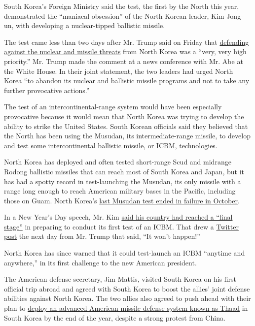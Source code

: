 South Korea's Foreign Ministry said the test, the first by the North
this year, demonstrated the ``maniacal obsession'' of the North Korean
leader, Kim Jong-un, with developing a nuclear-tipped ballistic missile.

The test came less than two days after Mr. Trump said on Friday that
\href{https://www.nytimes.com/reuters/2017/02/10/world/asia/10reuters-usa-trump-japan.html}{defending
against the nuclear and missile threats} from North Korea was a ``very,
very high priority.'' Mr. Trump made the comment at a news conference
with Mr. Abe at the White House. In their joint statement, the two
leaders had urged North Korea ``to abandon its nuclear and ballistic
missile programs and not to take any further provocative actions.''

The test of an intercontinental-range system would have been especially
provocative because it would mean that North Korea was trying to develop
the ability to strike the United States. South Korean officials said
they believed that the North has been using the Musudan, its
intermediate-range missile, to develop and test some intercontinental
ballistic missile, or ICBM, technologies.

North Korea has deployed and often tested short-range Scud and midrange
Rodong ballistic missiles that can reach most of South Korea and Japan,
but it has had a spotty record in test-launching the Musudan, its only
missile with a range long enough to reach American military bases in the
Pacific, including those on Guam. North Korea's
\href{https://www.nytimes.com/2016/10/20/world/asia/north-korea-musudan-missile-failure.html}{last
Musudan test ended in failure in October}.

In a New Year's Day speech, Mr. Kim
\href{https://www.nytimes.com/2017/01/01/world/asia/north-korea-intercontinental-ballistic-missile-test-kim-jong-un.html}{said
his country had reached a ``final stage''} in preparing to conduct its
first test of an ICBM. That drew a
\href{https://twitter.com/realdonaldtrump/status/816057920223846400?lang=en}{Twitter
post} the next day from Mr. Trump that said, ``It won't happen!''

North Korea has since warned that it could test-launch an ICBM ``anytime
and anywhere,'' in its first challenge to the new American president.

The American defense secretary, Jim Mattis, visited South Korea on his
first official trip abroad and agreed with South Korea to boost the
allies' joint defense abilities against North Korea. The two allies also
agreed to push ahead with their plan to
\href{https://www.nytimes.com/2017/02/02/world/asia/james-mattis-us-korea-thaad.html}{deploy
an advanced American missile defense system known as Thaad} in South
Korea by the end of the year, despite a strong protest from China.

